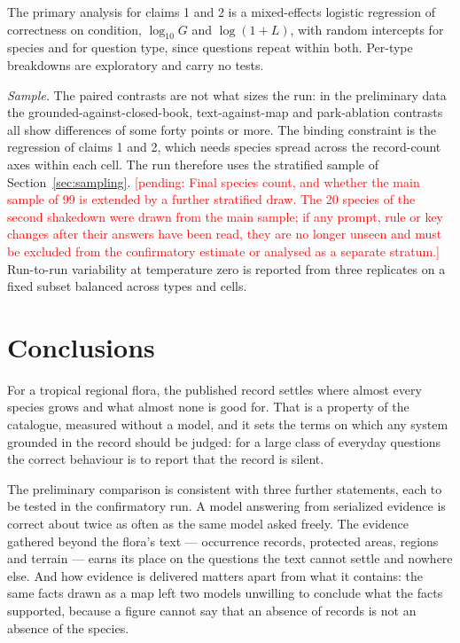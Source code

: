 \documentclass[11pt,a4paper]{article}
\newcommand{\pending}[1]{\textcolor{red}{[pending: #1]}}
\begin{document}
The primary analysis for claims 1 and 2 is a mixed-effects logistic regression of
correctness on condition, $\log_{10} G$ and $\log(1+L)$, with random intercepts for
species and for question type, since questions repeat within both. Per-type
breakdowns are exploratory and carry no tests.

\emph{Sample.} The paired contrasts are not what sizes the run: in the preliminary
data the grounded-against-closed-book, text-against-map and park-ablation contrasts
all show differences of some forty points or more. The binding constraint is the
regression of claims 1 and 2, which needs species spread across the record-count
axes within each cell. The run therefore uses the stratified sample of
Section~\ref{sec:sampling}. \pending{Final species count, and whether the main
sample of 99 is extended by a further stratified draw. The 20 species of the second
shakedown were drawn from the main sample; if any prompt, rule or key changes after
their answers have been read, they are no longer unseen and must be excluded from the
confirmatory estimate or analysed as a separate stratum.} Run-to-run variability at
temperature zero is reported from three replicates on a fixed subset balanced across
types and cells.

\section{Conclusions}

For a tropical regional flora, the published record settles where almost every
species grows and what almost none is good for. That is a property of the catalogue,
measured without a model, and it sets the terms on which any system grounded in the
record should be judged: for a large class of everyday questions the correct
behaviour is to report that the record is silent.

The preliminary comparison is consistent with three further statements, each to be
tested in the confirmatory run. A model answering from serialized evidence is
correct about twice as often as the same model asked freely. The evidence gathered
beyond the flora's text --- occurrence records, protected areas, regions and terrain
--- earns its place on the questions the text cannot settle and nowhere else. And how
evidence is delivered matters apart from what it contains: the same facts drawn as a
map left two models unwilling to conclude what the facts supported, because a figure
cannot say that an absence of records is not an absence of the species.
\end{document}
